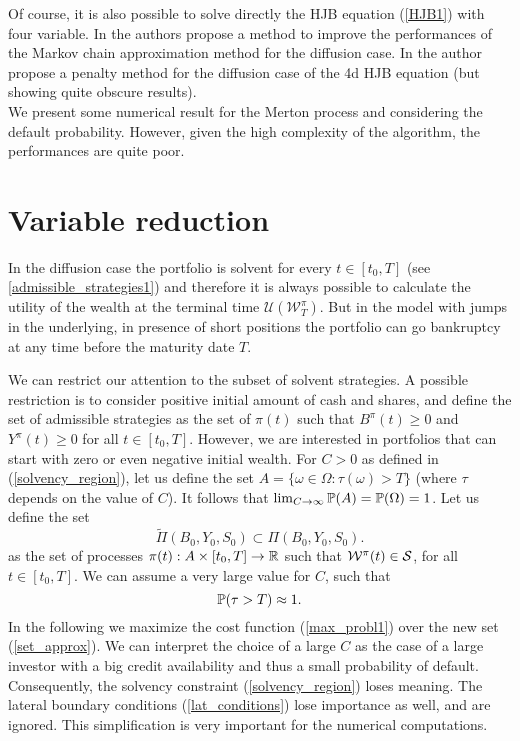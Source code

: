 Of course, it is also possible to solve directly the HJB equation (\ref{HJB1}) with four variable. 
In \cite{Pal15} the authors propose a method to improve the performances of the Markov chain approximation method for the diffusion case. In \cite{Song14} the author propose
a penalty method for the diffusion case of the 4d HJB equation (but showing quite obscure results).\\
We present some numerical result for the Merton process and considering the default probability. However, given the high complexity of the algorithm, the performances 
are quite poor.


\section{Variable reduction}\label{reduction_sec}



In the diffusion case the portfolio is solvent for every
$t \in [t_0,T]$ (see \ref{admissible_strategies1}) and therefore it is always possible to calculate the utility 
of the wealth at the terminal time $\mathcal{U}(\mathcal{W}^{\pi}_T)$.
But in the model with jumps in the underlying, in presence of short positions the portfolio can go bankruptcy at any time before the maturity date $T$. 

We can restrict our attention to the subset of solvent strategies. 
A possible restriction is to consider positive initial amount of cash and shares, and define the set of admissible strategies as the set of $\pi(t)$ such that 
$B^{\pi}(t)\geq 0$ and $Y^{\pi}(t)\geq 0$ for all $t\in [t_0,T]$.
However, we are interested in portfolios that can start with zero or even negative initial wealth. 
For $C>0$ as defined in (\ref{solvency_region}), let us define the set
$A = \bigl\{ \omega \in \Omega : \tau(\omega) > T \bigr\}$ (where $\tau$ depends on the value of $C$).
It follows that $\lim_{C\to \infty} \mathbb{P}(A) = \mathbb{P}(\Omega) = 1$. 
Let us define the set 
\begin{equation}\label{set_approx}
 \tilde \Pi(B_0,Y_0,S_0)  \subset  \Pi(B_0,Y_0,S_0).
\end{equation}
as the set of processes $\pi(t): A \times [t_0,T]\to \mathbb{R}$ such that $\mathcal{W}^{\pi}(t) \in \mathcal{S}$, for all $t\in [t_0,T]$.
We can assume a very large value for $C$, such that
\begin{equation}\label{P_tau}
 \mathbb{P}(\tau > T) \approx 1.
\end{equation}
In the following we maximize the cost function (\ref{max_probl1}) over the new set (\ref{set_approx}).
We can interpret the choice of a large $C$ as the case
of a large investor with a big credit availability and thus a small probability of default. 
Consequently, the solvency constraint (\ref{solvency_region}) loses meaning.
The lateral boundary conditions (\ref{lat_conditions}) lose importance as well, and are ignored. This simplification is very important
for the numerical computations.

